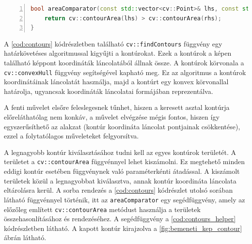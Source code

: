 \vspace{2mm}
\hspace{-10mm}
\begin{minipage}{\linewidth}
\begin{lstlisting}[language=C++, numbers=left, caption={Sorba rendezéshez használt segédfüggvény.}, label={cod:contours_helper}]
bool areaComparator(const std::vector<cv::Point>& lhs, const std::vector<cv::Point>& rhs) {
    return cv::contourArea(lhs) > cv::contourArea(rhs);
}
\end{lstlisting}
\end{minipage}

\par A \ref{cod:contours} kódrészletben található \lstinline{cv::findContours} függvény \cite{opencv_docs, SUZUKI198532} egy határkövetéses algoritmussal kigyűjti a kontúrokat. Ezek a kontúrok a képen található képpont koordináták láncolatából állnak össze. A kontúrok körvonala a \lstinline{cv::convexHull} függvény \cite{opencv_docs, SKLANSKY198279} segítségével kapható meg. Ez az algoritmus a kontúrok koordinátáinak láncolatát használja, majd a kontúrt egy konvex körvonallal határolja, ugyancsak koordináták láncolatai formájában reprezentálva.
\par A fenti művelet elsőre feleslegesnek tűnhet, hiszen a keresett asztal kontúrja előreláthatólag nem konkáv, a művelet elvégzése mégis fontos, hiszen így egyszerűsíthető az alakzat (kontúr koordináta láncolat pontjainak csökkentése), ezzel a folytatólagos műveleteket felgyorsítva.
\par A legnagyobb kontúr kiválasztásához tudni kell az egyes kontúrok területét. A területet a \lstinline{cv::contourArea} függvénnyel \cite{opencv_docs} lehet kiszámolni. Ez megtehető minden eddigi kontúr esetében függvénynek való paraméterkénti átadással. A kiszámolt területek közül a legnagyobbat kiválasztva, annak kontúr koordináta láncolata eltárolásra kerül. A sorba rendezés a \ref{cod:contours} kódrészlet utolsó sorában látható függvénnyel történik, itt az \lstinline{areaComparator} egy segédfüggvény, amely az előzőleg említett \lstinline{cv::contourArea} metódust\cite{opencv_docs} használja a területek összehasonlításához és rendezéséhez. A segédfüggvény a \ref{cod:contours_helper} kódrészletben látható. A kapott kontúr kirajzolva a \ref{fig:bemeneti_kep_contour} ábrán látható.

